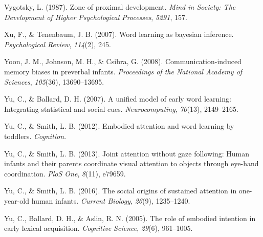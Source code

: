 \documentclass[a4paper,man,apacite,floatsintext]{apa6}
\begin{document}
\hypertarget{ref-vygotsky1987zone}{}
Vygotsky, L. (1987). Zone of proximal development. \emph{Mind in
Society: The Development of Higher Psychological Processes},
\emph{5291}, 157.

\hypertarget{ref-xu2007word}{}
Xu, F., \& Tenenbaum, J. B. (2007). Word learning as bayesian inference.
\emph{Psychological Review}, \emph{114}(2), 245.

\hypertarget{ref-yoon2008communication}{}
Yoon, J. M., Johnson, M. H., \& Csibra, G. (2008). Communication-induced
memory biases in preverbal infants. \emph{Proceedings of the National
Academy of Sciences}, \emph{105}(36), 13690--13695.

\hypertarget{ref-yu2007unified}{}
Yu, C., \& Ballard, D. H. (2007). A unified model of early word
learning: Integrating statistical and social cues.
\emph{Neurocomputing}, \emph{70}(13), 2149--2165.

\hypertarget{ref-yu2012embodied}{}
Yu, C., \& Smith, L. B. (2012). Embodied attention and word learning by
toddlers. \emph{Cognition}.

\hypertarget{ref-yu2013joint}{}
Yu, C., \& Smith, L. B. (2013). Joint attention without gaze following:
Human infants and their parents coordinate visual attention to objects
through eye-hand coordination. \emph{PloS One}, \emph{8}(11), e79659.

\hypertarget{ref-yu2016social}{}
Yu, C., \& Smith, L. B. (2016). The social origins of sustained
attention in one-year-old human infants. \emph{Current Biology},
\emph{26}(9), 1235--1240.

\hypertarget{ref-yu2005role}{}
Yu, C., Ballard, D. H., \& Aslin, R. N. (2005). The role of embodied
intention in early lexical acquisition. \emph{Cognitive Science},
\emph{29}(6), 961--1005.


\end{document}

